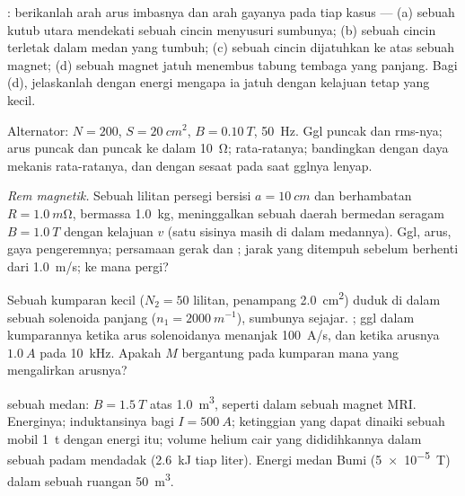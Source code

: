 \begin{exercise}[$\star\star$]\label{exo:b1:induction:5}
: berikanlah arah arus imbasnya dan arah
gayanya pada tiap kasus --- (a) sebuah kutub utara mendekati sebuah cincin menyusuri
sumbunya; (b) sebuah cincin terletak dalam medan yang tumbuh; (c) sebuah cincin dijatuhkan
ke atas sebuah magnet; (d) sebuah magnet jatuh menembus tabung tembaga yang panjang. Bagi (d),
jelaskanlah dengan energi mengapa ia jatuh dengan kelajuan tetap yang kecil.
\end{exercise}

\begin{exercise}[$\star\star$]\label{exo:b1:induction:6}
Alternator: $N = 200$, $S = \qty{20}{cm^2}$, $B = \qty{0.10}{T}$, \qty{50}{Hz}.
Ggl puncak dan rms-nya; arus puncak dan  puncak ke dalam \qty{10}{\ohm};  rata-ratanya; bandingkan dengan daya mekanis rata-ratanya, dan dengan
 sesaat pada saat gglnya lenyap.
\end{exercise}

\begin{exercise}[$\star\star$]\label{exo:b1:induction:7}
\emph{Rem magnetik.} Sebuah lilitan persegi bersisi $a = \qty{10}{cm}$ dan
berhambatan $R = \qty{1.0}{m\ohm}$, bermassa \qty{1.0}{kg}, meninggalkan sebuah daerah
bermedan seragam $B = \qty{1.0}{T}$ dengan kelajuan $v$ (satu sisinya masih di dalam
medannya). Ggl, arus, gaya pengeremnya; persamaan gerak dan ; jarak yang ditempuh sebelum berhenti dari \qty{1.0}{m/s}; ke mana
 pergi?
\end{exercise}

\begin{exercise}[$\star\star$]\label{exo:b1:induction:8}
Sebuah kumparan kecil ($N_2 = 50$ lilitan, penampang \qty{2.0}{cm^2}) duduk di dalam
sebuah solenoida panjang ($n_1 = \qty{2000}{m^{-1}}$), sumbunya sejajar. ; ggl dalam kumparannya ketika arus solenoidanya menanjak
\qty{100}{A/s}, dan ketika arusnya $\qty{1.0}{A}$ pada \qty{10}{kHz}. Apakah $M$
bergantung pada kumparan mana yang mengalirkan arusnya?
\end{exercise}

\begin{exercise}[$\star\star$]\label{exo:b1:induction:9}
 sebuah medan: $B = \qty{1.5}{T}$ atas \qty{1.0}{m^3}, seperti dalam sebuah magnet
MRI. Energinya; induktansinya bagi $I = \qty{500}{A}$; ketinggian yang dapat dinaiki
sebuah mobil \qty{1}{t} dengan energi itu; volume helium cair yang dididihkannya
dalam sebuah padam mendadak (\qty{2.6}{kJ} tiap liter). Energi medan Bumi
(\qty{5e-5}{T}) dalam sebuah ruangan \qty{50}{m^3}.
\end{exercise}

